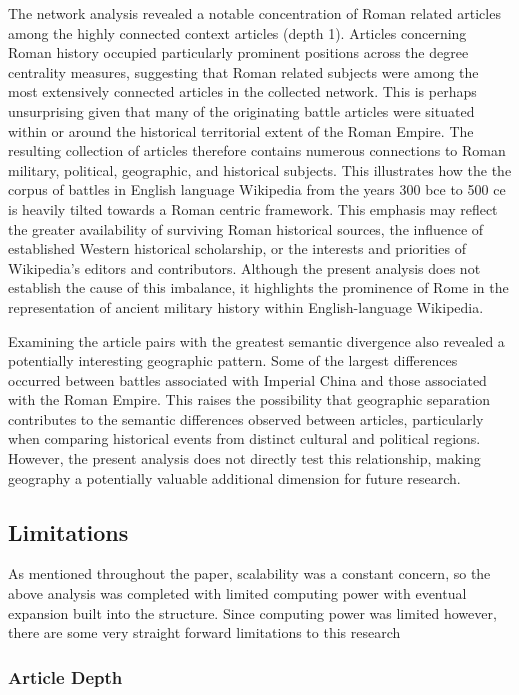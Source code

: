 \documentclass[
  letterpaper,
  DIV=11,
  numbers=noendperiod]{scrartcl}
\begin{document}
The network analysis revealed a notable concentration of Roman related
articles among the highly connected context articles (depth 1). Articles
concerning Roman history occupied particularly prominent positions
across the degree centrality measures, suggesting that Roman related
subjects were among the most extensively connected articles in the
collected network. This is perhaps unsurprising given that many of the
originating battle articles were situated within or around the
historical territorial extent of the Roman Empire. The resulting
collection of articles therefore contains numerous connections to Roman
military, political, geographic, and historical subjects. This
illustrates how the the corpus of battles in English language Wikipedia
from the years 300 bce to 500 ce is heavily tilted towards a Roman
centric framework. This emphasis may reflect the greater availability of
surviving Roman historical sources, the influence of established Western
historical scholarship, or the interests and priorities of Wikipedia's
editors and contributors. Although the present analysis does not
establish the cause of this imbalance, it highlights the prominence of
Rome in the representation of ancient military history within
English-language Wikipedia.

Examining the article pairs with the greatest semantic divergence also
revealed a potentially interesting geographic pattern. Some of the
largest differences occurred between battles associated with Imperial
China and those associated with the Roman Empire. This raises the
possibility that geographic separation contributes to the semantic
differences observed between articles, particularly when comparing
historical events from distinct cultural and political regions. However,
the present analysis does not directly test this relationship, making
geography a potentially valuable additional dimension for future
research.

\subsection{Limitations}\label{limitations}

As mentioned throughout the paper, scalability was a constant concern,
so the above analysis was completed with limited computing power with
eventual expansion built into the structure. Since computing power was
limited however, there are some very straight forward limitations to
this research

\subsubsection{Article Depth}\label{article-depth}
\end{document}
